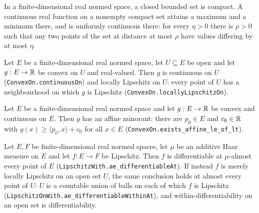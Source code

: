 \begin{proposition}
In a finite-dimensional real normed space, a closed bounded set is compact. A
continuous real function on a nonempty compact set attains a maximum and a
minimum there, and is uniformly continuous there: for every $\eta>0$ there is
$\rho>0$ such that any two points of the set at distance at most $\rho$ have
values differing by at most $\eta$.
\end{proposition}

\begin{proposition}
Let $E$ be a finite-dimensional real normed space, let $U\subseteq E$ be open
and let $g:E\to\mathbb{R}$ be convex on $U$ and real-valued. Then $g$ is continuous on
$U$ (\texttt{ConvexOn.continuousOn}) and locally Lipschitz on $U$: every point
of $U$ has a neighbourhood on which $g$ is Lipschitz
(\texttt{ConvexOn.locallyLipschitzOn}).
\end{proposition}

\begin{proposition}
Let $E$ be a finite-dimensional real normed space and let $g:E\to\mathbb{R}$ be convex
and continuous on $E$. Then $g$ has an affine minorant: there are $p_0\in E$ and
$c_0\in\mathbb{R}$ with $g(x)\ge\langle p_0,x\rangle+c_0$ for all $x\in E$
(\texttt{ConvexOn.exists\_affine\_le\_of\_lt}).
\end{proposition}

\begin{proposition}
Let $E,F$ be finite-dimensional real normed spaces, let $\mu$ be an additive
Haar measure on $E$ and let $f:E\to F$ be Lipschitz. Then $f$ is differentiable
at $\mu$-almost every point of $E$
(\texttt{LipschitzWith.ae\_differentiableAt}). If instead $f$ is merely locally
Lipschitz on an open set $U$, the same conclusion holds at almost every point of
$U$: $U$ is a countable union of balls on each of which $f$ is Lipschitz
(\texttt{LipschitzOnWith.ae\_differentiableWithinAt}), and within-differentiability
on an open set is differentiability.
\end{proposition}

